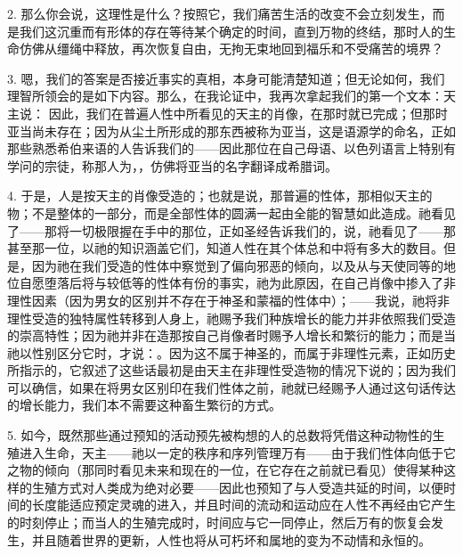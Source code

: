 2. 那么你会说，这理性是什么？按照它，我们痛苦生活的改变不会立刻发生，而是我们这沉重而有形体的存在等待某个确定的时间，直到万物的终结，那时人的生命仿佛从缰绳中释放，再次恢复自由，无拘无束地回到福乐和不受痛苦的境界？\par

3. 嗯，我们的答案是否接近事实的真相，本身可能清楚知道；但无论如何，我们理智所领会的是如下内容。那么，在我论证中，我再次拿起我们的第一个文本：天主说： 因此，我们在普遍人性中所看见的天主的肖像，在那时就已完成；但那时亚当尚未存在；因为从尘土所形成的那东西被称为亚当，这是语源学的命名，正如那些熟悉希伯来语的人告诉我们的——因此那位在自己母语、以色列语言上特别有学问的宗徒，称那人为，，仿佛将亚当的名字翻译成希腊词。\par

4. 于是，人是按天主的肖像受造的；也就是说，那普遍的性体，那相似天主的物；不是整体的一部分，而是全部性体的圆满一起由全能的智慧如此造成。祂看见了——那将一切极限握在手中的那位，正如圣经告诉我们的，说，祂看见了——那甚至那一位，以祂的知识涵盖它们，知道人性在其个体总和中将有多大的数目。但是，因为祂在我们受造的性体中察觉到了偏向邪恶的倾向，以及从与天使同等的地位自愿堕落后将与较低等的性体有份的事实，祂为此原因，在自己肖像中掺入了非理性因素（因为男女的区别并不存在于神圣和蒙福的性体中）；——我说，祂将非理性受造的独特属性转移到人身上，祂赐予我们种族增长的能力并非依照我们受造的崇高特性；因为祂并非在造那按自己肖像者时赐予人增长和繁衍的能力；而是当祂以性别区分它时，才说：。因为这不属于神圣的，而属于非理性元素，正如历史所指示的，它叙述了这些话最初是由天主在非理性受造物的情况下说的；因为我们可以确信，如果在将男女区别印在我们性体之前，祂就已经赐予人通过这句话传达的增长能力，我们本不需要这种畜生繁衍的方式。\par

5. 如今，既然那些通过预知的活动预先被构想的人的总数将凭借这种动物性的生殖进入生命，天主——祂以一定的秩序和序列管理万有——由于我们性体向低于它之物的倾向（那同时看见未来和现在的一位，在它存在之前就已看见）使得某种这样的生殖方式对人类成为绝对必要——因此也预知了与人受造共延的时间，以便时间的长度能适应预定灵魂的进入，并且时间的流动和运动应在人性不再经由它产生的时刻停止；而当人的生殖完成时，时间应与它一同停止，然后万有的恢复会发生，并且随着世界的更新，人性也将从可朽坏和属地的变为不动情和永恒的。\par

